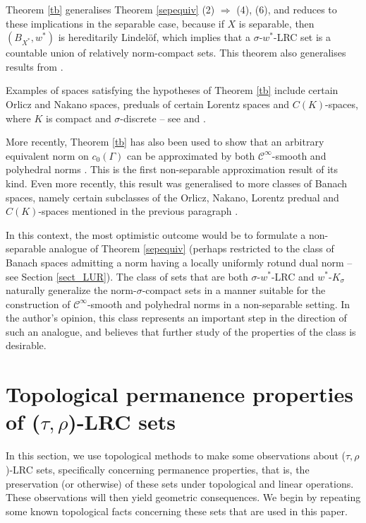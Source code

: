 \documentclass[12pt,reqno]{amsart}
\newcommand{\ball}[1]{\ensuremath{B_{#1}}}
\newcommand{\dual}[1]{\ensuremath{{#1}^*}}
\theoremstyle{definition}
\begin{document}
Theorem \ref{tb} generalises Theorem \ref{sepequiv} (2) $\Rightarrow$ (4), (6), and reduces to these implications in the separable case, because if $X$ is separable, then $(\ball{\dual{X}},w^*)$ is hereditarily Lindel\"of, which implies that a $\sigma$-$w^*$-LRC set is a countable union of relatively norm-compact sets. This theorem also generalises results from \cite{fpst:08,hh:07}.

Examples of spaces satisfying the hypotheses of Theorem \ref{tb} include certain Orlicz and Nakano spaces, preduals of certain Lorentz spaces and $C(K)$-spaces, where $K$ is compact and $\sigma$-discrete  -- see \cite[Example 3.9]{bible:14} and \cite[Examples 16 and 18, and Corollary 19]{fpst:14}.

More recently, Theorem \ref{tb} has also been used to show that an arbitrary equivalent norm on $c_0(\Gamma)$ can be approximated by both $\mathscr{C}^\infty$-smooth and polyhedral norms \cite{bs:16}. This is the first non-separable approximation result of its kind. Even more recently, this result was generalised to more classes of Banach spaces, namely certain subclasses of the Orlicz, Nakano, Lorentz predual and $C(K)$-spaces mentioned in the previous paragraph \cite{st:18}.

In this context, the most optimistic outcome would be to formulate a non-separable analogue of Theorem \ref{sepequiv} (perhaps restricted to the class of Banach spaces admitting a norm having a locally uniformly rotund dual norm -- see Section \ref{sect_LUR}). The class of sets that are both $\sigma$-$w^*$-LRC and $w^*$-$K_\sigma$ naturally generalize the norm-$\sigma$-compact sets in a manner suitable for the construction of $\mathscr{C}^\infty$-smooth and polyhedral norms in a non-separable setting. In the author's opinion, this class represents an important step in the direction of such an analogue, and believes that further study of the properties of the class is desirable. 

\section{Topological permanence properties of ($\tau,\rho$)-LRC sets}\label{sect-top}

In this section, we use topological methods to make some observations about ($\tau,\rho$)-LRC sets, specifically concerning permanence properties, that is, the preservation (or otherwise) of these sets under topological and linear operations. These observations will then yield geometric consequences. We begin by repeating some known topological facts concerning these sets that are used in this paper. 
\end{document}
